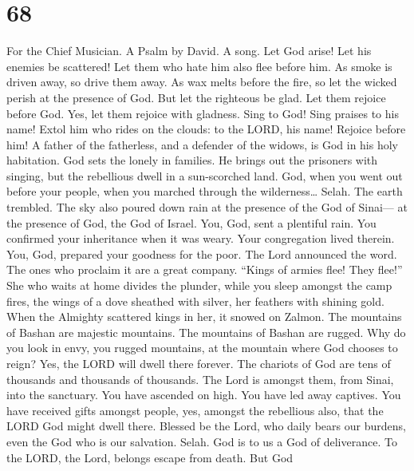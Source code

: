\hypertarget{section-66}{%
\section{68}\label{section-66}}

For the Chief Musician. A Psalm by David. A song.  Let God
arise! Let his enemies be scattered! Let them who hate him also flee
before him.  As smoke is driven away, so drive them away. As
wax melts before the fire, so let the wicked perish at the presence of
God.  But let the righteous be glad. Let them rejoice before
God. Yes, let them rejoice with gladness.  Sing to God! Sing
praises to his name! Extol him who rides on the clouds: to the LORD, his
name! Rejoice before him!  A father of the fatherless, and a
defender of the widows, is God in his holy habitation.  God
sets the lonely in families. He brings out the prisoners with singing,
but the rebellious dwell in a sun-scorched land.  God, when
you went out before your people, when you marched through the
wilderness\ldots{} Selah.  The earth trembled. The sky also
poured down rain at the presence of the God of Sinai--- at the presence
of God, the God of Israel.  You, God, sent a plentiful rain.
You confirmed your inheritance when it was weary.  Your
congregation lived therein. You, God, prepared your goodness for the
poor.  The Lord announced the word. The ones who proclaim
it are a great company.  ``Kings of armies flee! They
flee!'' She who waits at home divides the plunder,  while
you sleep amongst the camp fires, the wings of a dove sheathed with
silver, her feathers with shining gold.  When the Almighty
scattered kings in her, it snowed on Zalmon.  The mountains
of Bashan are majestic mountains. The mountains of Bashan are rugged.
 Why do you look in envy, you rugged mountains, at the
mountain where God chooses to reign? Yes, the LORD will dwell there
forever.  The chariots of God are tens of thousands and
thousands of thousands. The Lord is amongst them, from Sinai, into the
sanctuary.  You have ascended on high. You have led away
captives. You have received gifts amongst people, yes, amongst the
rebellious also, that the LORD God might dwell there. 
Blessed be the Lord, who daily bears our burdens, even the God who is
our salvation. Selah.  God is to us a God of deliverance.
To the LORD, the Lord, belongs escape from death.  But God
